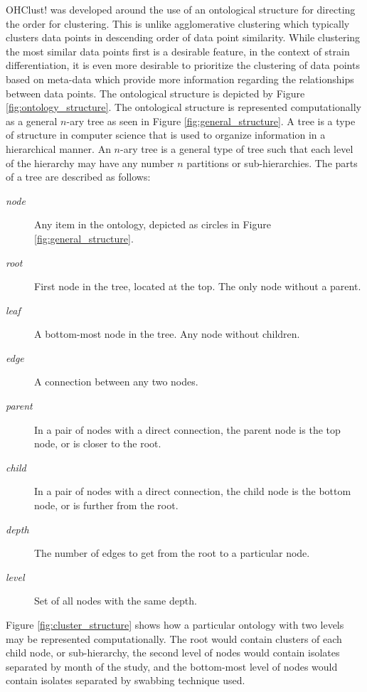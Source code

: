 \documentclass[12pt]{ucthesis}
\begin{document}
      \textsf{OHClust!} was developed around the use of an ontological
      structure for directing the order for clustering. This is unlike
      \textsf{agglomerative clustering} which typically clusters data points in
      descending order of data point similarity. While clustering the most
      similar data points first is a desirable feature, in the context of
      strain differentiation, it is even more desirable to prioritize the
      clustering of data points based on meta-data which provide more
      information regarding the relationships between data points. The
      ontological structure is depicted by Figure \ref{fig:ontology_structure}.
      The ontological structure is represented computationally as a general
      $n$-ary tree as seen in Figure \ref{fig:general_structure}. A tree is a
      type of structure in computer science that is used to organize
      information in a hierarchical manner. An $n$-ary tree is a general type
      of tree such that each level of the hierarchy may have any number $n$
      partitions or sub-hierarchies. The parts of a tree are described as
      follows:
      \begin{description}
         \item[\em{node}] Any item in the ontology, depicted as circles in Figure
                          \ref{fig:general_structure}.
         \item[\em{root}] First node in the tree, located at the top. The only
                          node without a parent.
         \item[\em{leaf}] A bottom-most node in the tree. Any node without
                          children.
         \item[\em{edge}] A connection between any two nodes.
         \item[\em{parent}] In a pair of nodes with a direct connection, the
                            parent node is the top node, or is closer to the
                            root.
         \item[\em{child}] In a pair of nodes with a direct connection, the child
                           node is the bottom node, or is further from the root.
         \item[\em{depth}] The number of edges to get from the root to a
                           particular node.
         \item[\em{level}] Set of all nodes with the same depth.
      \end{description}
      Figure \ref{fig:cluster_structure} shows how a particular ontology with two
      levels may be represented computationally. The root would contain clusters
      of each child node, or sub-hierarchy, the second level of nodes would
      contain isolates separated by month of the study, and the bottom-most level
      of nodes would contain isolates separated by swabbing technique used.
\end{document}
